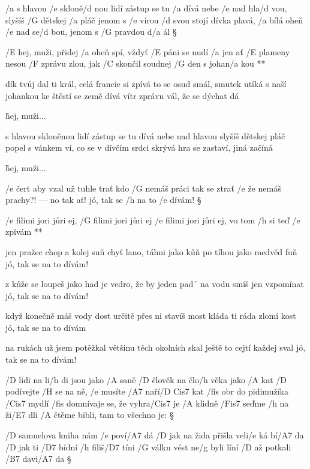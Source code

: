 
/a s hlavou /e skloně/d nou lidí zástup se tu /a dívá
nebe /e nad hla/d vou, slyšíš /G dětskej /a pláč
jenom s /e vírou /d svou stojí dívka plavá, /a bílá
oheň /e nad se/d bou, jenom s /G pravdou d/a ál \S

\R /E hej, muži, přidej /a oheň spí, vždyť /E páni se nudí /a jen
   ať /E plameny nesou /F zprávu zlou, jak /C skončil
   soudnej /G den
   s johan/a kou **

dík tvůj dal ti král, celá francie si zpívá
to se osud smál, smutek utíká
s naší johankou ke štěstí se země dívá
vítr zprávu vál, že se dýchat dá \s

\r hej, muži...

s hlavou skloněnou lidí zástup se tu dívá
nebe nad hlavou slyšíš dětskej pláč
popel s vánkem ví, co se v dívčím srdci skrývá
hra se zastaví, jiná začíná \s

\r hej, muži...




/e čert aby vzal už tuhle trať
kdo /G nemáš práci tak se ztrať
/e že nemáš prachy?! --- no tak ať!
jó, tak se /h na to /e dívám! \S

\R /e filimi jori jůri ej, /G filimi jori jůri ej
   /e filimi jori jůri ej, vo tom /h si teď /e zpívám **

jen pražec chop a kolej suň
chyť lano, táhni jako kůň
po tíhou jako medvěd fuň
jó, tak se na to dívám! \s

z kůže se loupeš jako had
je vedro, že by jeden pad´
na vodu smíš jen vzpomínat
jó, tak se na to dívám! \s

když konečně máš vody dost
určitě přes ni stavíš most
kláda ti ráda zlomí kost
jó, tak se na to dívám \s

na rukách už jsem potěžkal
většinu těch okolních skal
ještě to cejtí každej sval
jó, tak se na to dívám! \s




/D lidi na li/h di jsou jako /A saně
/D člověk na člo/h věka jako /A kat
/D podívejte /H se na ně, /e musíte /A7 naří/{D Cis7} kat
/fis obr do pidimužíka /Cis7 mydlí
/fis domnívaje se, že vyhra/Cis7 je
/A klidně /Fis7 seďme /h na ži/E7 dli
/A čtěme bibli, tam to všechno je: \S

/D samuelova kniha nám /e poví/A7 dá
/D jak na žida přišla veli/e ká bí/A7 da
/D jak ti /D7 bídní /h filiš/D7 tíni %
/G válku vést ne/g byli líní
/D až potkali /B7 davi/A7 da \S

